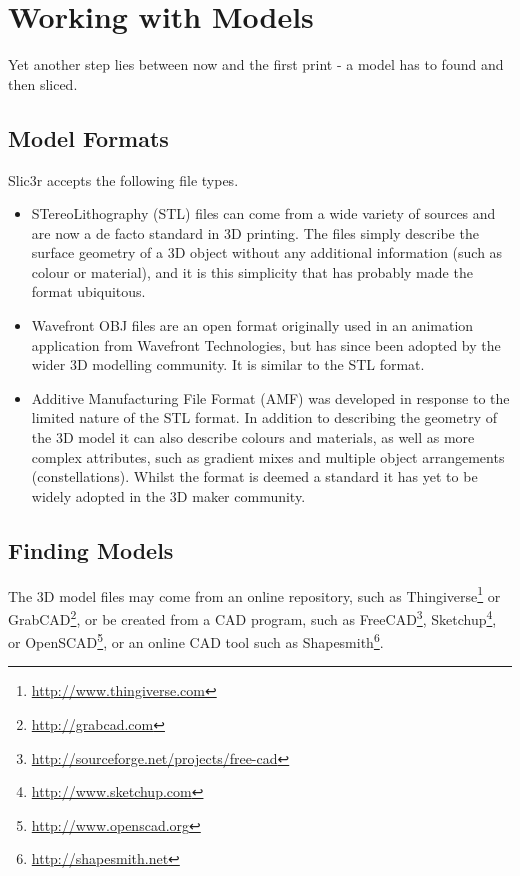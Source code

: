 \section{Working with Models}
\label{sub:working_with_models}

Yet another step lies between now and the first print - a model has to found and then sliced.

\subsection{Model Formats} %
\label{sub:model_formats}

Slic3r accepts the following file types.

\begin{itemize}
	\item STereoLithography (STL) files can come from a wide variety of sources and are now a de facto standard in 3D printing.  The files simply describe the surface geometry of a 3D object without any additional information (such as colour or material), and it is this simplicity that has probably made the format ubiquitous.
	\item Wavefront OBJ files are an open format originally used in an animation application from Wavefront Technologies, but has since been adopted by the wider 3D modelling community.  It is similar to the STL format.
	\item Additive Manufacturing File Format (AMF) was developed in response to the limited nature of the STL format.  In addition to describing the geometry of the 3D model it can also describe colours and materials, as well as more complex attributes, such as gradient mixes and multiple object arrangements (constellations).  Whilst the format is deemed a standard it has yet to be widely adopted in the 3D maker community.
\end{itemize}

\subsection{Finding Models} %
\label{sub:finding_models}

The 3D model files may come from an online repository, such as Thingiverse\footnote{\url{http://www.thingiverse.com}} or GrabCAD\footnote{\url{http://grabcad.com}}, or be created from a CAD program, such as FreeCAD\footnote{\url{http://sourceforge.net/projects/free-cad}}, Sketchup\footnote{\url{http://www.sketchup.com}}, or OpenSCAD\footnote{\url{http://www.openscad.org}}, or an online CAD tool such as Shapesmith\footnote{\url{http://shapesmith.net}}.  


